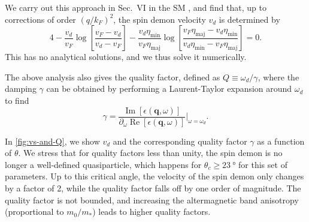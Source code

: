 \documentclass[aps,prl,reprint,twocolumns,superscriptaddress]{revtex4-2}
\newcommand{\deltaq}{\eta_{{\mathrm{min}}}(\theta)/\eta_{{\mathrm{maj}}}(\theta)}
\DeclareMathOperator{\Imm}{Im}
\DeclareMathOperator{\Ree}{Re}
\newcommand{\kF}{k_{F}}
\newcommand{\vs}{v_d}
\begin{document}
	We carry out this approach in Sec.~VI in the SM \cite{Note1}, and find that, up to corrections of order $(q/\kF)^2$, the spin demon velocity $\vs$ is determined by 
	\begin{equation}
		4 -\frac{\vs}{v_F} \log\left[\frac{v_F-\vs}{\vs-v_F}\right] - \frac{\vs\eta_{{\mathrm{min}}}}{v_F\eta_{{\mathrm{maj}}}} \log\left[\frac{v_F\eta_{{\mathrm{maj}}}-\vs\eta_{{\mathrm{min}}}}{\vs\eta_{{\mathrm{min}}}-v_F\eta_{{\mathrm{maj}}}}\right] = 0. \label{eq:zeros-vs}
	\end{equation}
	This has no analytical solutions, and we thus solve it numerically.
	
	
	
	
	
	The above analysis also gives the quality factor, defined as $Q \equiv \omega_d / \gamma$, where the damping $\gamma$ can be obtained by performing a Laurent-Taylor expansion around $\omega_d$ to find 
	\begin{equation}
		\gamma = \frac{\Imm[\epsilon(\bm q,\omega)]}{\partial_\omega \Ree[\epsilon(\bm q,\omega)]}\Bigr|_{\omega=\omega_d}.
	\end{equation}
	
	
	In \cref{fig:vs-and-Q}, we show $\vs$ and the corresponding quality factor $\gamma$ as a function of $\theta$. We stress that for quality factors less than unity, the spin demon is no longer a well-defined quasiparticle, which happens for $\theta_c\ge\SI{23}{\degree}$ for this set of parameters. Up to this critical angle, the velocity of the spin demon only changes by a factor of 2, while the quality factor falls off by one order of magnitude. The quality factor is not bounded, and increasing the altermagnetic band anisotropy (proportional to $m_0/m_*$) leads to higher quality factors.
	
	
\end{document}
